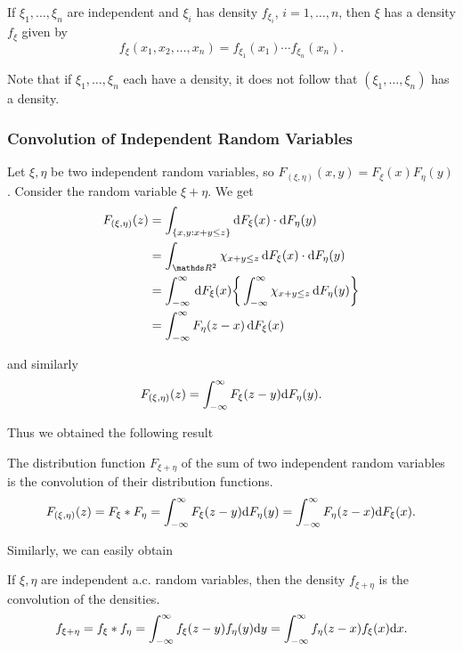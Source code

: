 \begin{corollary}
If $\xi_1,\dots, \xi_n$ are independent and $\xi_i$ has density $f_{\xi_i}$, $i = 1,\dots, n$, then $\xi$ has a density $f_\xi$ given by
\begin{equation*}
    f_\xi(x_1, x_2, \dots, x_n) = f_{\xi_1}(x_1)\cdots f_{\xi_n}(x_n).
\end{equation*}
\end{corollary}

\begin{remark}
Note that if $\xi_1,\dots, \xi_n$ each have a density, it does not follow that $(\xi_1,\dots, \xi_n)$ has a density.
\end{remark}

\subsubsection{Convolution of Independent Random Variables}
Let $\xi, \eta$ be two independent random variables, so $F_{(\xi,\eta)} (x,y)= F_\xi(x) F_\eta(y)$. Consider the random variable $\xi + \eta$. We get
\begin{align*}
    F_{(\xi,\eta)}(z) &= \int_{\{x,y:x+y \le z \}} \d F_\xi(x) \cdot \d F_\eta(y)\\
    &=\int_{\R^2}\chi_{x+y\le z} \, \d F_\xi(x) \cdot \d F_\eta(y)\\
    &=\int_{-\infty}^\infty \, \d F_\xi(x) \bigg\{ \int_{-\infty}^\infty \chi_{x+y \le z} \, \d F_\eta(y) \bigg\}\\
    &=\int_{-\infty}^\infty F_{\eta}(z-x) \, \d F_\xi(x)
\end{align*}

and similarly 
\begin{equation*}
    F_{(\xi,\eta)}(z) = \int_{-\infty}^\infty F_{\xi}(z-y) \mathrm{d} F_\eta(y).
\end{equation*}

Thus we obtained the following result
\begin{proposition}
The distribution function $F_{\xi + \eta}$ of the sum of two independent random variables is the convolution of their distribution functions. 
\begin{equation}
    F_{(\xi,\eta)}(z) = F_\xi * F_\eta = \int_{-\infty}^\infty F_{\xi}(z-y) \mathrm{d} F_\eta(y) = \int_{-\infty}^\infty F_{\eta}(z-x) \mathrm{d} F_\xi(x).
\end{equation}
\end{proposition}

Similarly, we can easily obtain
\begin{corollary}
If $\xi, \eta$ are independent a.c. random variables, then the density $f_{\xi + \eta}$ is the convolution of the densities.
\begin{equation}
    f_{\xi + \eta} = f_\xi * f_\eta = \int_{-\infty}^\infty f_{\xi}(z-y) f_\eta(y) \mathrm{d} y = \int_{-\infty}^\infty f_{\eta}(z-x) f_\xi(x)\mathrm{d} x.
\end{equation}
\end{corollary}

